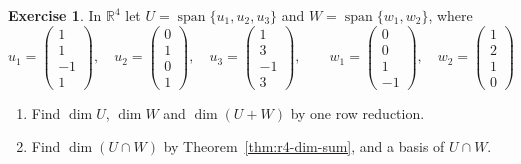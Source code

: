 \documentclass[12pt]{article}
\newcommand{\R}{\mathbb R}
\DeclareMathOperator{\Span}{span}
\theoremstyle{definition}
\newtheorem{exercise}{Exercise}
\begin{document}
\begin{exercise}\label{r4-dr-sum-intersection}
In \(\R^4\) let \(U=\Span\{u_1,u_2,u_3\}\) and \(W=\Span\{w_1,w_2\}\), where
\[
u_1=\begin{pmatrix}1\\1\\-1\\1\end{pmatrix},\quad u_2=\begin{pmatrix}0\\1\\0\\1\end{pmatrix},\quad
u_3=\begin{pmatrix}1\\3\\-1\\3\end{pmatrix},\qquad w_1=\begin{pmatrix}0\\0\\1\\-1\end{pmatrix},\quad
w_2=\begin{pmatrix}1\\2\\1\\0\end{pmatrix}
\]
\begin{enumerate}
\item Find \(\dim U\), \(\dim W\) and \(\dim(U+W)\) by one row reduction.
\item Find \(\dim(U\cap W)\) by Theorem~\ref{thm:r4-dim-sum}, and a basis of \(U\cap W\).
\end{enumerate}
\end{exercise}
\end{document}
